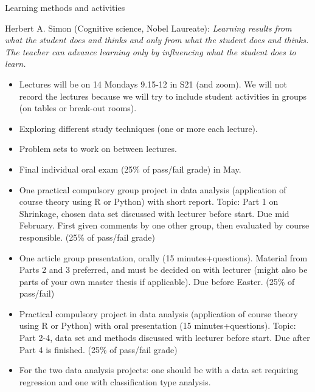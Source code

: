 \documentclass[
  ignorenonframetext,
]{beamer}
\begin{document}
\begin{frame}{Learning methods and activities}
\protect\hypertarget{learning-methods-and-activities}{}

Herbert A. Simon (Cognitive science, Nobel Laureate): \emph{Learning
results from what the student does and thinks and only from what the
student does and thinks. The teacher can advance learning only by
influencing what the student does to learn.}

\begin{itemize}
\item
  Lectures will be on 14 Mondays 9.15-12 in S21 (and zoom). We will not
  record the lectures because we will try to include student activities
  in groups (on tables or break-out rooms).
\item
  Exploring different study techniques (one or more each lecture).
\item
  Problem sets to work on between lectures.
\item
  Final individual oral exam (25\% of pass/fail grade) in May.
\end{itemize}

\end{frame}

\begin{frame}

\begin{itemize}
\item
  One practical compulsory group project in data analysis (application
  of course theory using R or Python) with short report. Topic: Part 1
  on Shrinkage, chosen data set discussed with lecturer before start.
  Due mid February. First given comments by one other group, then
  evaluated by course responsible. (25\% of pass/fail grade)
\item
  One article group presentation, orally (15 minutes+questions).
  Material from Parts 2 and 3 preferred, and must be decided on with
  lecturer (might also be parts of your own master thesis if
  applicable). Due before Easter. (25\% of pass/fail)
\item
  Practical compulsory project in data analysis (application of course
  theory using R or Python) with oral presentation (15
  minutes+questions). Topic: Part 2-4, data set and methods discussed
  with lecturer before start. Due after Part 4 is finished. (25\% of
  pass/fail grade)
\item
  For the two data analysis projects: one should be with a data set
  requiring regression and one with classification type analysis.
\end{itemize}

\end{frame}
\end{document}
